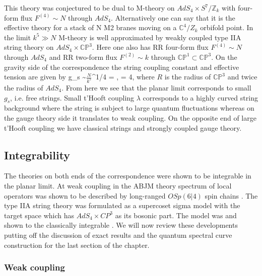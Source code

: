 This theory was conjectured \cite{Aharony:2008ug} to be dual to M-theory on $AdS_4 \times S^7 / \mathbb{Z}_k$ with four-form flux $F^{(4)} \sim N$ through $AdS_4$. 
Alternatively one can say that it is the effective theory for a stack of N M2 branes moving on a $\mathbb{C}^4 / Z_k$ orbifold point. 
In the limit $k^5 \gg N$ M-theory is well approximated by weakly coupled type IIA string theory on $AdS_4 \times \mathbb{CP}^3$.
Here one also has RR four-form flux $F^{(4)} \sim N $ through $AdS_4$ and RR two-form flux $F^{(2)} \sim k $ through $\mathbb{CP}^1 \subset \mathbb{CP}^3$. 
On the gravity side of the correspondence the string coupling constant and effective tension are given by
\beq
	g_s \sim \( \frac{N}{k^5} \)^{1/4} = , \;\;\;\;\;  = 4\pi \sqrt{2\lambda},
\eeq
where $R$ is the radius of $\mathbb{CP}^3$ and twice the radius of $AdS_4$.
From here we see that the planar limit corresponds to small $g_s$, i.e. free strings.
Small t'Hooft coupling $\lambda$ corresponds to a highly curved string background where the string is subject to large quantum fluctuations whereas on the gauge theory side it translates to weak coupling. 
On the opposite end of large t'Hooft coupling we have classical strings and strongly coupled gauge theory.


\subsection{Integrability}
\label{sec:abjm_integrability}

The theories on both ends of the correspondence were shown to be integrable in the planar limit.
At weak coupling in the ABJM theory spectrum of local operators was shown to be described by long-ranged $OSp(6|4)$ spin chains \cite{Minahan:2008hf}.
The type IIA string theory was formulated as a supercoset sigma model with the target space
\beq
{}
\eeq
which has $AdS_4\times CP^3$ as its bosonic part.
The model was and shown to the classically integrable \cite{Stefanski:2008ik,Arutyunov:2008if}. 
We will now review these developments putting off the discussion of exact results and the quantum spectral curve construction for the last section of the chapter. 

\subsubsection{Weak coupling}

